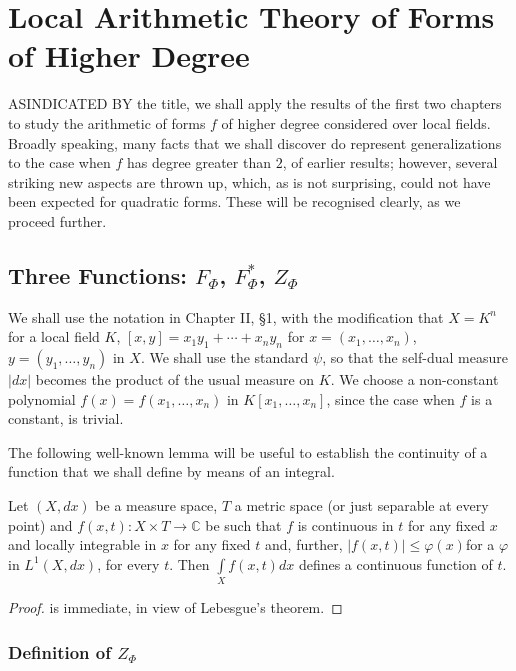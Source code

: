 
\chapter{Local Arithmetic Theory of Forms of Higher Degree}\label{chap3} %

AS\pageoriginale INDICATED BY the title, we shall apply the results of
the first two chapters to study the arithmetic of forms $f$ of higher
degree considered over local fields. Broadly speaking, many facts that
we shall discover do represent generalizations to the case when $f$
has degree greater than $2$, of earlier results; however, several
striking new aspects are thrown up, which, as is not surprising, could
not have been expected for quadratic forms. These will be recognised
clearly, as we proceed further.

\section{Three Functions: $F_{\Phi}$, $F^{\ast}_{\Phi}$,
  $Z_{\Phi}$}\label{chap3:sec1} %

We shall use the notation in Chapter II,
\S 1, with the modification that $X=K^{n}$ for a
local field $K$, $[x,y]=x_{1}y_{1}+\cdots+x_{n}y_{n}$ for
$x=(x_{1},\ldots,x_{n})$, $y=(y_{1},\ldots,y_{n})$ in $X$. We shall
use the standard $\psi$, so that the self-dual measure $|dx|$ becomes
the product of the usual measure on $K$. We choose a non-constant
polynomial $f(x)=f(x_{1},\ldots,x_{n})$ in $K[x_{1},\ldots,x_{n}]$,
since the case when $f$ is a constant, is trivial.

The following well-known lemma will be useful to establish the
continuity of a function that we shall define by means of an integral.

\begin{lemma*}
  Let $(X,dx)$ be a measure space, $T$ a metric space (or just separable
  at every point) and $f(x,t):X\times T\to \mathbb{C}$ be such that $f$
  is continuous in $t$ for any fixed $x$ and locally integrable in $x$
  for any fixed $t$ and, further, $|f(x,t)|\leq
  \varphi(x)$\pageoriginale for a $\varphi$ in $L^{1}(X,dx)$, for every
  $t$. Then $\int\limits_{X}f(x,t)dx$ defines a continuous function of $t$.
\end{lemma*}

\begin{proof}
  is immediate, in view of Lebesgue's theorem.
\end{proof}

\subsection{Definition of $Z_{\Phi}$}\label{chap3:sec1:subsec1} %

